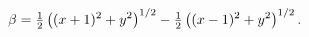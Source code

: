 \[\beta=\tfrac{1}{2}\left((x+1)^{2}+y^{2}\right)^{1/2}-\tfrac{1}{2}\left((x-1)^{%
2}+y^{2}\right)^{1/2}.\]